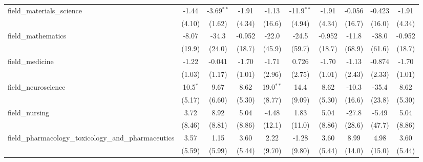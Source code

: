 \begin{tabular}{lccccccccc}
   field\_materials\_science                                   & -1.44         & -3.69$^{**}$  & -1.91         & -1.13        & -11.9$^{**}$ & -1.91         & -0.056       & -0.423  & -1.91\\   
                                                               & (4.10)        & (1.62)        & (4.34)        & (16.6)       & (4.94)       & (4.34)        & (16.7)       & (16.0)  & (4.34)\\   
   field\_mathematics                                          & -8.07         & -34.3         & -0.952        & -22.0        & -24.5        & -0.952        & -11.8        & -38.0   & -0.952\\   
                                                               & (19.9)        & (24.0)        & (18.7)        & (45.9)       & (59.7)       & (18.7)        & (68.9)       & (61.6)  & (18.7)\\   
   field\_medicine                                             & -1.22         & -0.041        & -1.70         & -1.71        & 0.726        & -1.70         & -1.13        & -0.874  & -1.70\\   
                                                               & (1.03)        & (1.17)        & (1.01)        & (2.96)       & (2.75)       & (1.01)        & (2.43)       & (2.33)  & (1.01)\\   
   field\_neuroscience                                         & 10.5$^{*}$    & 9.67          & 8.62          & 19.0$^{**}$  & 14.4         & 8.62          & -10.3        & -35.4   & 8.62\\   
                                                               & (5.17)        & (6.60)        & (5.30)        & (8.77)       & (9.09)       & (5.30)        & (16.6)       & (23.8)  & (5.30)\\   
   field\_nursing                                              & 3.72          & 8.92          & 5.04          & -4.48        & 1.83         & 5.04          & -27.8        & -5.49   & 5.04\\   
                                                               & (8.46)        & (8.81)        & (8.86)        & (12.1)       & (11.0)       & (8.86)        & (28.6)       & (47.7)  & (8.86)\\   
   field\_pharmacology\_toxicology\_and\_pharmaceutics         & 3.57          & 1.15          & 3.60          & 2.22         & -1.28        & 3.60          & 8.99         & 4.98    & 3.60\\   
                                                               & (5.59)        & (5.99)        & (5.44)        & (9.70)       & (9.80)       & (5.44)        & (14.0)       & (15.0)  & (5.44)\\   

\end{tabular}
